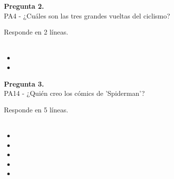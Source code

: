 \documentclass[12pt,a4paper,twoside]{article}
\begin{document}
            \noindent\parbox[t]{\textwidth}
                {
                    \textbf{Pregunta 2.} \\
                    {
                        PA4 - ¿Cuáles son las tres grandes vueltas del ciclismo?\\
                    }\par\noindent Responde en 2 líneas.\\
                \\
                }
                \begin{itemize}[left=1.5cm,label={}, itemsep=0.02em] 
                
                    \item
                
                    \item
                
                \end{itemize}
        
            \noindent\parbox[t]{\textwidth}
                {
                    \textbf{Pregunta 3.} \\
                    {
                        PA14 - ¿Quién creo los cómics de 'Spiderman'?\\
                    }\par\noindent Responde en 5 líneas.\\
                \\
                }
                \begin{itemize}[left=1.5cm,label={}, itemsep=0.02em] 
                
                    \item
                
                    \item
                
                    \item
                
                    \item
                
                    \item
                
                \end{itemize}
        
\end{document}
